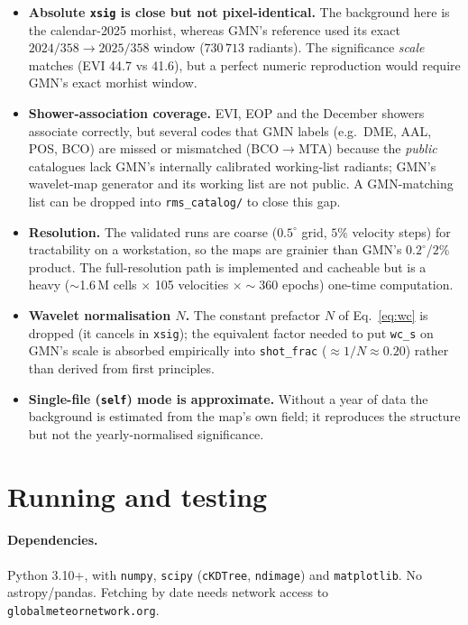 \documentclass[11pt]{article}
\begin{document}
\begin{itemize}
  \item \textbf{Absolute \texttt{xsig} is close but not pixel-identical.} The
  background here is the calendar-2025 morhist, whereas GMN's reference used its
  exact $2024/358\to2025/358$ window ($730\,713$ radiants). The significance
  \emph{scale} matches (EVI 44.7 vs 41.6), but a perfect numeric reproduction
  would require GMN's exact morhist window.

  \item \textbf{Shower-association coverage.} EVI, EOP and the December showers
  associate correctly, but several codes that GMN labels (e.g.\ DME, AAL, POS,
  BCO) are missed or mismatched (BCO$\to$MTA) because the \emph{public}
  catalogues lack GMN's internally calibrated working-list radiants; GMN's
  wavelet-map generator and its working list are not public. A GMN-matching list
  can be dropped into \texttt{rms\_catalog/} to close this gap.

  \item \textbf{Resolution.} The validated runs are coarse ($0.5^\circ$ grid,
  $5\%$ velocity steps) for tractability on a workstation, so the maps are
  grainier than GMN's $0.2^\circ$/$2\%$ product. The full-resolution path is
  implemented and cacheable but is a heavy ($\sim$1.6\,M cells $\times$ 105
  velocities $\times \sim$360 epochs) one-time computation.

  \item \textbf{Wavelet normalisation $N$.} The constant prefactor $N$ of
  Eq.~\eqref{eq:wc} is dropped (it cancels in \texttt{xsig}); the equivalent
  factor needed to put \texttt{wc\_s} on GMN's scale is absorbed empirically into
  \texttt{shot\_frac} ($\approx 1/N \approx 0.20$) rather than derived from first
  principles.

  \item \textbf{Single-file (\texttt{self}) mode is approximate.} Without a year
  of data the background is estimated from the map's own field; it reproduces the
  structure but not the yearly-normalised significance.
\end{itemize}

\section{Running and testing}
\label{sec:run}

\paragraph{Dependencies.} Python 3.10+, with \texttt{numpy}, \texttt{scipy}
(\texttt{cKDTree}, \texttt{ndimage}) and \texttt{matplotlib}. No astropy/pandas.
Fetching by date needs network access to \texttt{globalmeteornetwork.org}.
\end{document}
